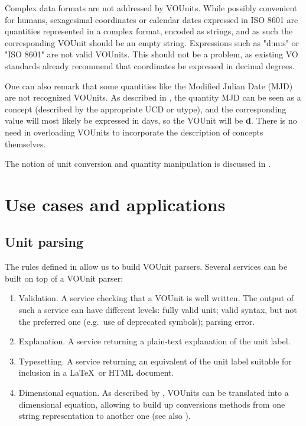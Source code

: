 \documentclass[12pt,notitlepage,onecolumn]{ivoa}
\def\eg{e.g.~}
\newcommand{\unit}[1]{\textbf{\textsf{\color{orange}#1}}}
\begin{document}
Complex data formats are not addressed by VOUnits. While possibly convenient for
humans, sexagesimal coordinates or calendar dates expressed in ISO 8601 are
quantities represented in a complex format, encoded as strings, and as such the
corresponding VOUnit should be an empty string. Expressions such as "d:m:s" or
"ISO 8601" are not valid VOUnits. This should not be a problem, as existing VO 
standards already recommend that coordinates be expressed in decimal degrees.

One can also remark that some quantities like the Modified Julian Date (MJD) are 
not recognized VOUnits. As described in , the quantity MJD can be 
seen as a concept (described by the appropriate UCD or utype), and the corresponding
value will most likely be expressed in days, so the VOUnit will be \unit{d}. There is 
no need in overloading VOUnits to incorporate the description of concepts themselves.

The notion of unit conversion and quantity manipulation is discussed in
.


\section{Use cases and applications\label{sec:useCase}}

\subsection{Unit parsing}

The rules defined in  allow us to build VOUnit parsers.
Several services can be built on top of a VOUnit parser:

\begin{enumerate}
\item Validation. A service checking that a VOUnit is well written. The output
of such a service can have different levels: fully valid unit; valid syntax, but
not the preferred one (\eg  use of deprecated symbols); parsing error. 
\item Explanation. A service returning a plain-text explanation of the unit label.
\item Typesetting. A service returning an equivalent of the unit label suitable for inclusion in
a \LaTeX\ or HTML document.
\item Dimensional equation. As described by \citet{osuna05}, VOUnits can be translated
into a dimensional equation, allowing to build up conversions methods from one string 
representation to another one (see also ). 
\end{enumerate}
\end{document}
